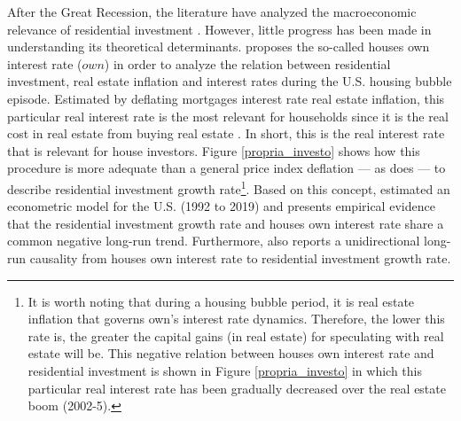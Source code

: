 \documentclass[11pt]{article}
\begin{document}
After the Great Recession, the literature have analyzed the macroeconomic relevance of residential investment \cites{leamer_housing_2015}{fiebiger_semi-autonomous_2018}.
However, little progress has been made in understanding its theoretical determinants.
\textcite{teixeira_crescimento_2015} proposes the so-called houses own interest rate (\(own\)) in order to analyze the relation between residential investment, real estate inflation and interest rates during the U.S. housing bubble episode.
Estimated by deflating mortgages interest rate real estate inflation, this particular real interest rate is the most relevant for households since it is the real cost in real estate from buying real estate  \cite[p.~53]{teixeira_crescimento_2015}.
In short, this is the real interest rate that is relevant for house investors.
Figure \ref{propria_investo} shows how this  procedure is more adequate than a general price index deflation --- as \textcite[p.~143--6]{fair_macroeconometric_2013} does --- to describe residential investment growth rate\footnote{It is worth noting that during a housing bubble period, it is real estate inflation that governs own's interest rate dynamics. Therefore, the lower this rate is, the greater the capital gains (in real estate) for speculating with real estate will be. This negative relation between houses own interest rate and residential investment is shown in Figure \ref{propria_investo} in which this particular real interest rate has been gradually decreased over the real estate boom (2002-5).}.
Based on this concept, \textcite{petrini_demanda_2019} estimated an econometric model for the U.S. (1992 to 2019) and presents empirical evidence that the residential investment growth rate and houses own interest rate share a common negative long-run trend.
Furthermore, \textcite{petrini_demanda_2019} also reports a unidirectional long-run causality from houses own interest rate to residential investment growth rate.
\end{document}

